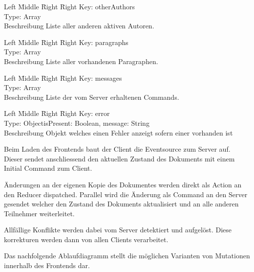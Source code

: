 \begin{tabbing}
    Left \= Middle \= Right \= Right \kill
    Key:  \> \> \> otherAuthors\\
    Type:  \> \> \> Array \\
    Beschreibung \>  \> \> Liste aller anderen aktiven Autoren.\\
\end{tabbing}

\begin{tabbing}
    Left \= Middle \= Right \= Right \kill
    Key:  \> \> \> paragraphs\\
    Type:  \> \> \> Array \\
    Beschreibung \>  \> \> Liste aller vorhandenen Paragraphen.\\
\end{tabbing}

\begin{tabbing}
    Left \= Middle \= Right \= Right \kill
    Key:  \> \> \> messages\\
    Type:  \> \> \> Array \\
    Beschreibung \>  \> \> Liste der vom Server erhaltenen Commands.\\
\end{tabbing}

\begin{tabbing}
    Left \= Middle \= Right \= Right \kill
    Key:  \> \> \> error\\
    Type:  \> \> \> Object{isPresent: Boolean, message: String} \\
    Beschreibung \>  \> \> Objekt welches einen Fehler anzeigt sofern einer vorhanden ist\\
\end{tabbing}

Beim Laden des Frontends baut der Client die Eventsource zum Server auf.
Dieser sendet anschliessend den aktuellen Zustand des Dokuments mit einem Initial Command zum Client.

Änderungen an der eigenen Kopie des Dokumentes werden direkt als Action an den Reducer dispatched.
Parallel wird die Änderung als Command an den Server gesendet welcher den Zustand des Dokuments aktualisiert und an alle anderen Teilnehmer weiterleitet.

Allfällige Konflikte werden dabei vom Server detektiert und aufgelöst.
Diese korrekturen werden dann von allen Clients verarbeitet.

Das nachfolgende Ablaufdiagramm stellt die möglichen Varianten von Mutationen innerhalb des Frontends dar.

